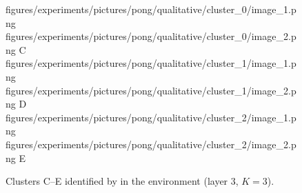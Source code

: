 \begin{figure}[H]
    \qualitativeClusterFigureSetup
    \qualitativeClusterTwo
        {figures/experiments/pictures/pong/qualitative/cluster_0/image_1.png}
        {figures/experiments/pictures/pong/qualitative/cluster_0/image_2.png}
        {C}
    \qualitativeClusterTwo
        {figures/experiments/pictures/pong/qualitative/cluster_1/image_1.png}
        {figures/experiments/pictures/pong/qualitative/cluster_1/image_2.png}
        {D}
    \qualitativeClusterTwo
        {figures/experiments/pictures/pong/qualitative/cluster_2/image_1.png}
        {figures/experiments/pictures/pong/qualitative/cluster_2/image_2.png}
        {E}
    \caption{Clusters C--E identified by  in the \PongName environment (layer 3, $K=3$).}
    \label{fig:qualitative_pong}
\end{figure}

